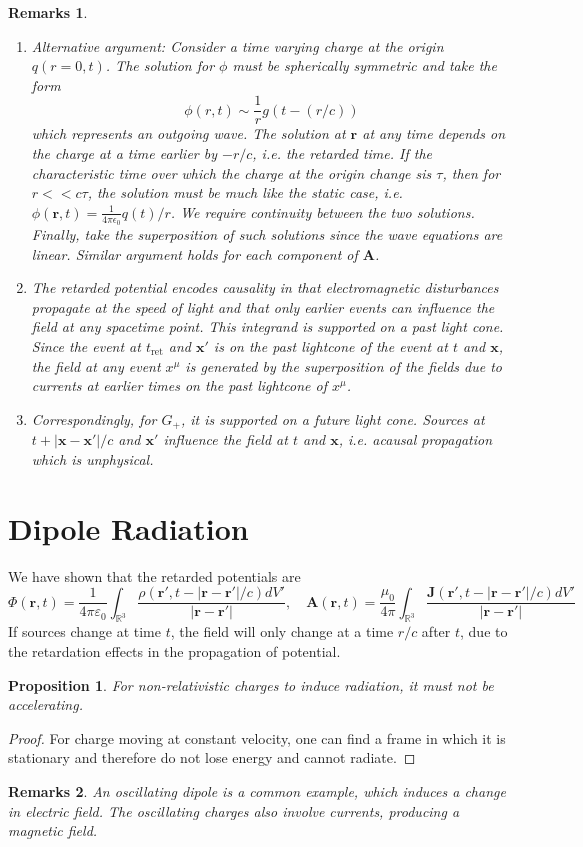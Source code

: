 \documentclass[a4paper]{article}
\newtheorem{remarks}{Remarks}[section]
\theoremstyle{new}
\newtheorem{prop}{Proposition}[section]
\begin{document}
\begin{remarks}\leavevmode
\begin{enumerate}
\item Alternative argument: Consider a time varying charge at the origin $q(r=0,t)$. The solution for $\phi$ must be spherically symmetric and take the form 
$$\phi(r,t)\sim\frac{1}{r}g(t-(r/c))$$
which represents an outgoing wave. The solution at $\mathbf{r}$ at any time depends on the charge at a time earlier by $-r/c$, i.e. the retarded time. If the characteristic time over which the charge at the origin change sis $\tau$, then for $r<<c\tau$, the solution must be much like the static case, i.e. $\phi(\mathbf{r},t)=\frac{1}{4\pi\epsilon_0}q(t)/r$. We require continuity between the two solutions. Finally, take the superposition of such solutions since the wave equations are linear. Similar argument holds for each component of $\mathbf{A}$.
\item The retarded potential encodes causality in that electromagnetic disturbances propagate at the speed of light and that only earlier events can influence the field at any spacetime point. This integrand is supported on a past light cone. Since the event at $t_{\text{ret}}$ and $\mathbf{x'}$ is on the past lightcone of the event at $t$ and $\mathbf{x}$, the field at any event $x^\mu$ is generated by the superposition of the fields due to currents at earlier times on the past lightcone of $x^\mu$. \item Correspondingly, for $G_+$, it is supported on a future light cone. Sources at $t+|\mathbf{x}-\mathbf{x'}|/c$ and $\mathbf{x'}$ influence the field at $t$ and $\mathbf{x}$, i.e. acausal propagation which is unphysical.
\end{enumerate}
\end{remarks}
\newpage
\section{Dipole Radiation}
We have shown that the retarded potentials are
$$\Phi(\mathbf{r},t)=\frac{1}{4\pi\varepsilon_0}\int_{\mathbb{R}^3}\frac{\rho(\mathbf{r'},t-|\mathbf{r}-\mathbf{r'}|/c)dV'}{|\mathbf{r}-\mathbf{r'}|},\quad \mathbf{A}(\mathbf{r},t)=\frac{\mu_0}{4\pi}\int_{\mathbb{R}^3}\frac{\mathbf{J}(\mathbf{r'},t-|\mathbf{r}-\mathbf{r'}|/c)dV'}{|\mathbf{r}-\mathbf{r'}|}$$
If sources change at time $t$, the field will only change at a time $r/c$ after $t$, due to the retardation effects in the propagation of potential. 
\begin{prop}
For non-relativistic charges to induce radiation, it must not be accelerating.
\end{prop}
\begin{proof}
For charge moving at constant velocity, one can find a frame in which it is stationary and therefore do not lose energy and cannot radiate.
\end{proof}
\begin{remarks}
An oscillating dipole is a common example, which induces a change in electric field. The oscillating charges also involve currents, producing a magnetic field.
\end{remarks}
\end{document}
